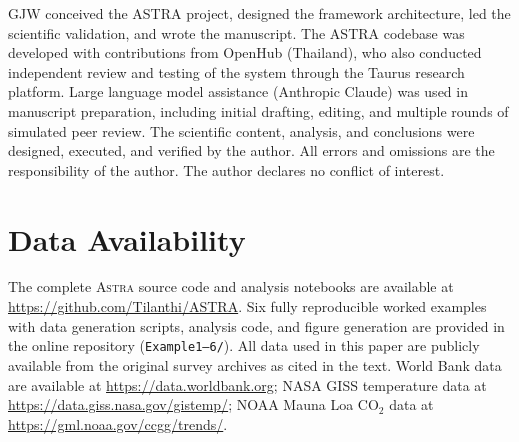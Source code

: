 \documentclass[usenatbib]{rasti}
\newcommand{\astra}{\textsc{Astra}\xspace}
\begin{document}
GJW conceived the ASTRA project, designed the framework architecture, led the scientific validation, and wrote the manuscript.
The ASTRA codebase was developed with contributions from OpenHub (Thailand), who also conducted independent review and testing of the system through the Taurus research platform.
Large language model assistance (Anthropic Claude) was used in manuscript preparation, including initial drafting, editing, and multiple rounds of simulated peer review.
The scientific content, analysis, and conclusions were designed, executed, and verified by the author.
All errors and omissions are the responsibility of the author.
The author declares no conflict of interest.

\section*{Data Availability}

The complete \astra source code and analysis notebooks are available at \url{https://github.com/Tilanthi/ASTRA}.
Six fully reproducible worked examples with data generation scripts, analysis code, and figure generation are provided in the online repository (\texttt{Example1--6/}).
All data used in this paper are publicly available from the original survey archives as cited in the text.
World Bank data are available at \url{https://data.worldbank.org}; NASA GISS temperature data at \url{https://data.giss.nasa.gov/gistemp/}; NOAA Mauna Loa CO$_{2}$ data at \url{https://gml.noaa.gov/ccgg/trends/}.



\end{document}

